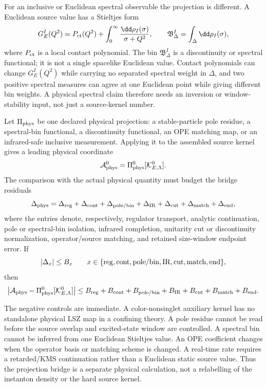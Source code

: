 For an inclusive or Euclidean spectral observable the projection is different.
A Euclidean source value has a Stieltjes form
\begin{equation}
  G_E^I(Q^2)
  =
  P_{\rm ct}(Q^2)
  +
  \int_0^\infty \frac{\dd\rho_I(\sigma)}{\sigma+Q^2},
  \qquad
  \mathfrak B_{\Delta}^I
  =
  \int_{\Delta}\dd\rho_I(\sigma),
  \label{eq:instanton-spectral-projection-window}
\end{equation}
where \(P_{\rm ct}\) is a local contact polynomial.  The bin
\(\mathfrak B_{\Delta}^I\) is a discontinuity or spectral functional; it is
not a single spacelike Euclidean value.  Contact polynomials can change
\(G_E^I(Q^2)\) while carrying no separated spectral weight in \(\Delta\), and
two positive spectral measures can agree at one Euclidean point while giving
different bin weights.  A physical spectral claim therefore needs an inversion
or window-stability input, not just a source-kernel number.

\begin{controlledapproximation}
\label{ca:instanton-source-kernel-physical-projection}
Let \(\Pi_{\rm phys}\) be one declared physical projection: a stable-particle
pole residue, a spectral-bin functional, a discontinuity functional, an OPE
matching map, or an infrared-safe inclusive measurement.  Applying it to the
assembled source
kernel gives a leading physical coordinate
\[
  \mathcal A_{\rm phys}^{0}
  =
  \Pi_{\rm phys}^{0}[\mathcal K_{E,\Lambda}^{0}].
\]
The comparison with the actual physical quantity must budget the bridge
residuals
\[
  \Delta_{\rm phys}
  =
  \Delta_{\rm reg}
  +\Delta_{\rm cont}
  +\Delta_{\rm pole/bin}
  +\Delta_{\rm IR}
  +\Delta_{\rm cut}
  +\Delta_{\rm match}
  +\Delta_{\rm end},
\]
where the entries denote, respectively, regulator transport, analytic
continuation, pole or spectral-bin isolation, infrared completion, unitarity
cut or discontinuity normalization, operator/source matching, and retained
size-window endpoint error.  If
\[
  |\Delta_x|\le B_x
  \qquad
  x\in\{{\rm reg,cont,pole/bin,IR,cut,match,end}\},
\]
then
\begin{equation}
  \left|
    \mathcal A_{\rm phys}
    -
    \Pi_{\rm phys}^{0}[\mathcal K_{E,\Lambda}^{0}]
  \right|
  \le
  B_{\rm reg}+B_{\rm cont}+B_{\rm pole/bin}+B_{\rm IR}
  +B_{\rm cut}+B_{\rm match}+B_{\rm end}.
  \label{eq:instanton-physical-bridge-residual-bound}
\end{equation}

The negative controls are immediate.  A color-nonsinglet auxiliary kernel has
no standalone physical LSZ map in a confining theory.  A pole residue cannot
be read before the source overlap and excited-state window are controlled.  A
spectral bin cannot be inferred from one Euclidean Stieltjes value.  An OPE
coefficient changes when the operator basis or matching scheme is changed.  A
real-time rate requires a retarded/KMS continuation rather than a Euclidean
static source value.  Thus the projection bridge is a separate physical
calculation, not a relabelling of the instanton density or the hard source
kernel.
\end{controlledapproximation}

